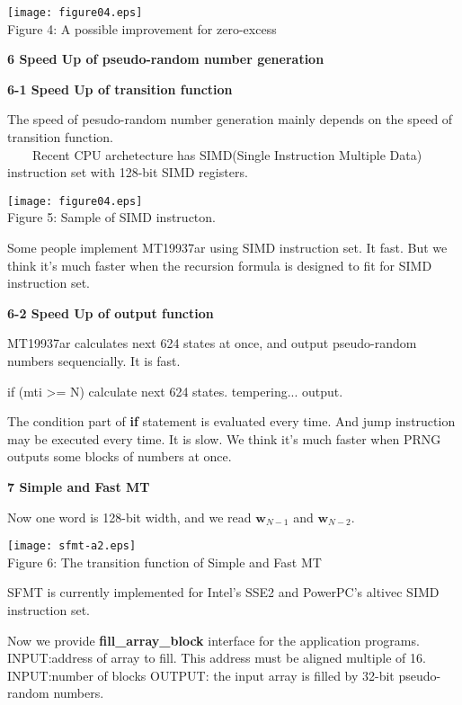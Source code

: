 \documentclass[a4j,12pt,landscape]{jarticle}
\def\bw{{{\mathbf w}}}
\begin{document}
\begin{center}
\texttt{[image: figure04.eps]}
\\
Figure 4: A possible improvement for zero-excess
\end{center}

\newpage
\noindent
{\bf 6 Speed Up of pseudo-random number generation}

{\bf 6-1 Speed Up of transition function}

The speed of pesudo-random number generation mainly depends on
the speed of transition function.\\
~~~~Recent CPU archetecture has SIMD(Single Instruction Multiple
Data) instruction set with 128-bit SIMD registers.

\begin{center}
\texttt{[image: figure04.eps]}
\\
Figure 5: Sample of SIMD instructon.
\end{center}
Some people implement MT19937ar using SIMD instruction set.
It fast. But we think it's much faster when the recursion formula is
designed to fit for SIMD instruction set.

\newpage
{\bf 6-2 Speed Up of output function}

MT19937ar calculates next 624 states at once,
and output pseudo-random numbers sequencially.
It is fast. 

if (mti >= N) {
  calculate next 624 states.
}
tempering...
output.

The condition part of {\bf if} statement is evaluated every time.
And jump instruction may be executed every time.
It is slow.
We think it's much faster when PRNG outputs
some blocks of numbers at once.

\newpage
\noindent
{\bf 7 Simple and Fast MT}

Now one word is 128-bit width,
and we read $\bw_{N-1}$ and $\bw_{N-2}$.

\begin{center}
\texttt{[image: sfmt-a2.eps]}
\\
Figure 6: The transition function of Simple and Fast MT
\end{center}
SFMT is currently implemented for Intel's SSE2 and PowerPC's altivec SIMD
instruction set.

\newpage
Now we provide {\bf fill\_array\_block} interface for the application programs.
INPUT:address of array to fill. This address must be aligned multiple of 16.
INPUT:number of blocks
OUTPUT: the input array is filled by 32-bit pseudo-random numbers.
\end{document}
